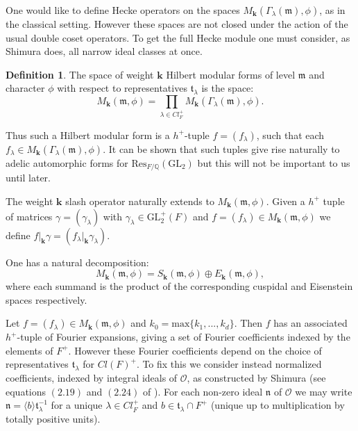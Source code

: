 \documentclass[a4paper,oneside]{amsart}
\theoremstyle{plain}
\theoremstyle{definition}
\newtheorem{define}[thm]{Definition}
\begin{document}
One would like to define Hecke operators on the spaces $M_{\textbf{k}}(\Gamma_\lambda(\mathfrak{m}),\phi)$, as in the classical setting. However these spaces are not closed under the action of the usual double coset operators. To get the full Hecke module one must consider, as Shimura does, all narrow ideal classes at once.

\begin{define}
The space of weight $\textbf{k}$ Hilbert modular forms of level $\mathfrak{m}$ and character $\phi$ with respect to representatives $\mathfrak{t}_{\lambda}$ is the space: \[M_{\textbf{k}}(\mathfrak{m},\phi) = \prod_{\lambda\in Cl^{+}_F} M_{\textbf{k}}(\Gamma_{\lambda}(\mathfrak{m}),\phi).\]
\end{define}

Thus such a Hilbert modular form is a $h^+$-tuple $f = (f_{\lambda})$, such that each $f_{\lambda}\in M_{\textbf{k}}(\Gamma_{\lambda}(\mathfrak{m}),\phi)$. It can be shown that such tuples give rise naturally to adelic automorphic forms for $\text{Res}_{F/\mathbb{Q}}(\text{GL}_2)$ but this will not be important to us until later.

The weight $\textbf{k}$ slash operator naturally extends to $M_{\textbf{k}}(\mathfrak{m},\phi)$. Given a $h^{+}$ tuple of matrices $\gamma = (\gamma_{\lambda})$ with $\gamma_{\lambda}\in \text{GL}^{+}_2(F)$ and $f = (f_{\lambda})\in M_{\textbf{k}}(\mathfrak{m},\phi)$ we define $f|_{\textbf{k}}\gamma = (f_{\lambda}|_{\textbf{k}}\gamma_{\lambda})$. 

One has a natural decomposition: \[M_{\textbf{k}}(\mathfrak{m},\phi) = S_{\textbf{k}}(\mathfrak{m},\phi) \oplus E_{\textbf{k}}(\mathfrak{m},\phi),\] where each summand is the product of the corresponding cuspidal and Eisenstein spaces respectively.

Let $f = (f_{\lambda}) \in M_{\textbf{k}}(\mathfrak{m},\phi)$ and $k_0 = \text{max}\{k_1,...,k_d\}$. Then $f$ has an associated $h^+$-tuple of Fourier expansions, giving a set of Fourier coefficients indexed by the elements of $F^+$. However these Fourier coefficients depend on the choice of representatives $\mathfrak{t}_\lambda$ for $Cl(F)^+$. To fix this we consider instead normalized coefficients, indexed by integral ideals of $\mathcal{O}$, as constructed by Shimura (see equations $(2.19)$ and $(2.24)$ of \cite{shimura}). For each non-zero ideal $\mathfrak{n}$ of $\mathcal{O}$ we may write $\mathfrak{n} = \langle b\rangle \mathfrak{t}_{\lambda}^{-1}$ for a unique $\lambda\in Cl_F^+$ and $b \in \mathfrak{t}_{\lambda} \cap F^+$ (unique up to multiplication by totally positive units).
\end{document}
